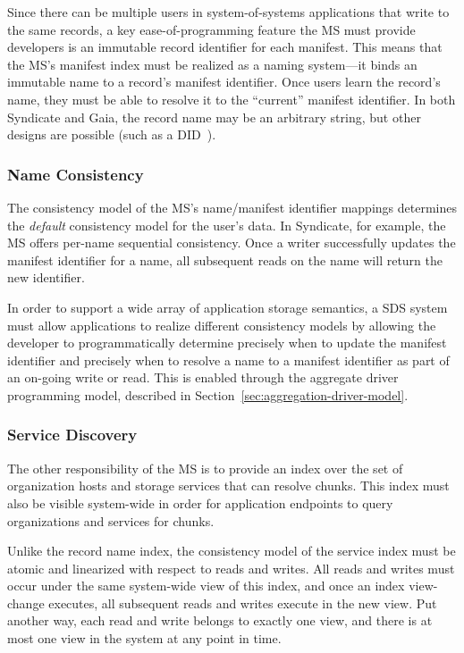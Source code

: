 Since there can be multiple users in system-of-systems applications that write
to the same records, a key ease-of-programming
feature the MS must provide developers is an immutable record identifier
for each manifest.  This means that the MS's manifest index must be realized as
a naming system---it binds an immutable name to a record's manifest identifier.
Once users learn the record's name, they must be able to resolve it to the
``current'' manifest identifier.  In both Syndicate and Gaia, the record
name may be an arbitrary string, but other designs are possible (such as a
DID~\cite{decentralized-identifiers}).

\subsubsection{Name Consistency}

The consistency model of the MS's name/manifest identifier mappings determines the \emph{default}
consistency model for the user's data.
In Syndicate, for example, the MS offers
per-name sequential consistency.  Once a writer successfully updates the manifest
identifier for a name, all subsequent reads on the name will return the new
identifier.

In order to support a wide array of application storage semantics, a
SDS system must allow applications to realize different consistency
models by allowing the developer to programmatically determine precisely
when to update the manifest identifier and precisely when to resolve a name to a
manifest identifier as part of an on-going write or read.
This is enabled through the aggregate driver programming model,
described in Section~\ref{sec:aggregation-driver-model}.

\subsubsection{Service Discovery}

The other responsibility of the MS is to provide an index over the set of
organization hosts and storage services that can resolve chunks.  This index
must also be visible system-wide in order for application endpoints to query
organizations and services for chunks.

Unlike the record name index, the consistency model of the service
index must be atomic and linearized with respect to reads and writes.
All reads and writes must occur under the same system-wide view of this
index, and once an index view-change executes, all subsequent reads and writes
execute in the new view.  Put another way, each read and write belongs to
exactly one view, and there is at most one view in the system at any point in
time.

